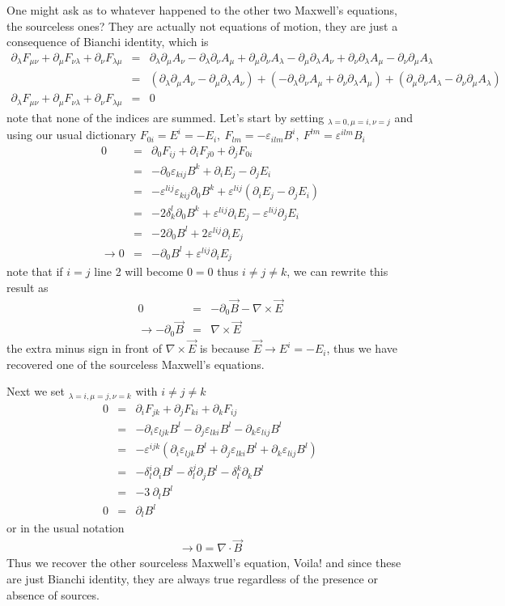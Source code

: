 \documentclass[aps,preprint,preprintnumbers,nofootinbib,showpacs,prd]{revtex4-1}
\newcommand{\nbea}{\begin{eqnarray*}}
\newcommand{\neea}{\end{eqnarray*}}
\begin{document}
One might ask as to whatever happened to the other two Maxwell's equations, the sourceless ones? They are actually not equations of motion, they are just a consequence of Bianchi identity, which is
%
\nbea
\partial_\lambda F_{\mu\nu} + \partial_\mu F_{\nu\lambda} + \partial_\nu F_{\lambda\mu} & = & \partial_\lambda\partial_\mu A_\nu - \partial_\lambda\partial_\nu A_\mu + \partial_\mu\partial_\nu A_\lambda - \partial_\mu \partial_\lambda A_\nu + \partial_\nu\partial_\lambda A_\mu - \partial_\nu\partial_\mu A_\lambda \\
& = & ( \partial_\lambda\partial_\mu A_\nu - \partial_\mu \partial_\lambda A_\nu ) + (- \partial_\lambda\partial_\nu A_\mu +  \partial_\nu\partial_\lambda A_\mu) + ( \partial_\mu\partial_\nu A_\lambda - \partial_\nu\partial_\mu A_\lambda) \\
\partial_\lambda F_{\mu\nu} + \partial_\mu F_{\nu\lambda} + \partial_\nu F_{\lambda\mu} & = & 0
\neea
%
note that none of the indices are summed. Let's start by setting $_{\lambda = 0, \mu = i, \nu =j}$ and using our usual dictionary $F_{0 i} =  E^i = -E_i, ~F_{lm} = -\varepsilon_{ilm} B^i,~ F^{lm} = \varepsilon^{ilm} B_i$
%
\nbea
0 & = & \partial_0 F_{ij} + \partial_i F_{j 0} + \partial_j F_{0 i} \\
& = & - \partial_0 \varepsilon_{kij} B^k + \partial_i E_j - \partial_j E_i \\
& = & -  \varepsilon^{lij} \varepsilon_{kij} \partial_0 B^k + \varepsilon^{lij} (\partial_i E_j - \partial_j E_i )\\
& = & - 2 \delta^l_k \partial_0 B^k + \varepsilon^{lij} \partial_i E_j - \varepsilon^{lij}  \partial_j E_i \\
& = & -2 \partial_0 B^l + 2 \varepsilon^{lij} \partial_i E_j \\
\rightarrow 0 & = & -\partial_0 B^l + \varepsilon^{lij} \partial_i E_j 
\neea
%
note that if $ i = j$ line 2 will become $0=0$ thus $i \neq j \neq k$, we can rewrite this result as
%
\nbea
0 & = & -\partial_0 \vec B - \nabla \times \vec E \\
\rightarrow  -\partial_0 \vec B & = & \nabla \times \vec E
\neea
%
the extra minus sign in front of $\nabla \times \vec E$ is because $\vec E \rightarrow E^i = - E_i$, thus we have recovered one of the sourceless Maxwell's equations.

Next we set $_{\lambda = i, \mu = j, \nu = k}$ with $i \neq j \neq k$
%
\nbea
0 & = & \partial_i F_{jk} + \partial_j F_{k i} + \partial_k F_{i j} \\
& = & - \partial_i \varepsilon_{ljk} B^l- \partial_j \varepsilon_{lki} B^l - \partial_k \varepsilon_{lij} B^l \\
& = & - \varepsilon^{ijk} ( \partial_i \varepsilon_{ljk} B^l + \partial_j \varepsilon_{lki} B^l + \partial_k \varepsilon_{lij} B^l) \\
& = & -\delta^i_l \partial_i  B^l - \delta^j_l \partial_j  B^l - \delta^k_l \partial_k  B^l \\
& = & - 3~\partial_l B^l \\
0 & = & \partial_l B^l
\neea
%
or in the usual notation
%
\nbea
\rightarrow 0 = \nabla \cdot \vec B
\neea
Thus we recover the other sourceless Maxwell's equation, Voila! and since these are just Bianchi identity, they are always true regardless of the presence or absence of sources.
\end{document}
